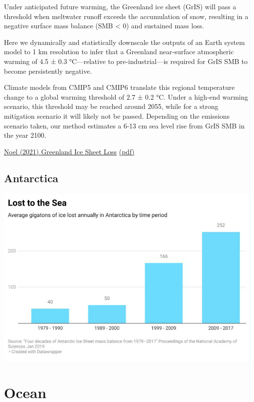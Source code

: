 \documentclass[
]{book}
\begin{document}
Under anticipated future warming, the Greenland ice sheet (GrIS) will
pass a threshold when meltwater runoff exceeds the accumulation of snow,
resulting in a negative surface mass balance (SMB \textless{} 0) and sustained mass loss.

Here we dynamically and statistically downscale the outputs of an
Earth system model to 1 km resolution to infer that a Greenland near‐surface
atmospheric warming of 4.5 ± 0.3 °C---relative to pre‐industrial---is required
for GrIS SMB to become persistently negative.

Climate models from CMIP5 and CMIP6 translate this regional temperature change
to a global warming threshold of 2.7 ± 0.2 °C.
Under a high‐end warming scenario, this threshold may be reached around 2055,
while for a strong mitigation scenario it will likely not be passed.
Depending on the emissions scenario taken, our method estimates a 6‐13 cm sea level rise
from GrIS SMB in the year 2100.

\href{https://agupubs.onlinelibrary.wiley.com/doi/10.1029/2020GL090471}{Noel (2021) Greenland Ice Sheet Loss}
\href{pdf/Noel_2021_Greenland_Ice_Sheet_Loss.pdf}{(pdf)}

\hypertarget{antarctica}{%
\section{Antarctica}\label{antarctica}}

\includegraphics{fig/Antarctica_Ice_Loss_to_Sea.jpeg}

\hypertarget{ocean}{%
\chapter{Ocean}\label{ocean}}
\end{document}
